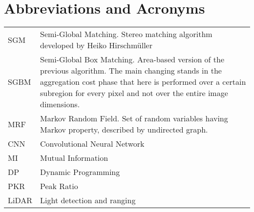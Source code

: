 \chapter*{Abbreviations and Acronyms}


\noindent
\begin{longtable}{@{}p{}p{}@{}}
SGM & Semi-Global Matching. Stereo matching algorithm developed by Heiko Hirschm\"{u}ller \\
SGBM & Semi-Global Box Matching. Area-based version of the previous algorithm. The main changing stands in the aggregation cost phase that here is performed over a certain subregion for every pixel and not over the entire image dimensions.\\
MRF & Markov Random Field. Set of random variables having Markov property, described by undirected graph. \\ 
CNN & Convolutional Neural Network \\
MI & Mutual Information \\
DP & Dynamic Programming \\
PKR & Peak Ratio \\
LiDAR & Light detection and ranging \\
\end{longtable}
